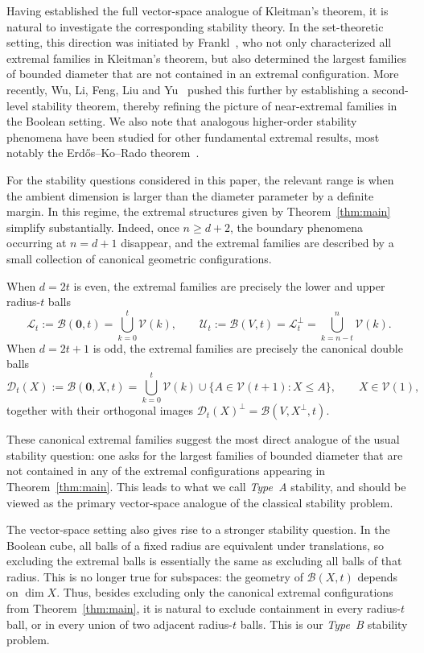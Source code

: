 \documentclass[11pt]{article}
\theoremstyle{definition}
\begin{document}
Having established the full vector-space analogue of Kleitman's theorem, it is natural to investigate the corresponding stability theory. In the set-theoretic setting, this direction was initiated by Frankl~\cite{F2017}, who not only characterized all extremal families in Kleitman's theorem, but also determined the largest families of bounded diameter that are not contained in an extremal configuration. More recently, Wu, Li, Feng, Liu and Yu~\cite{2025Li} pushed this further by establishing a second-level stability theorem, thereby refining the picture of near-extremal families in the Boolean setting. We also note that analogous higher-order stability phenomena have been studied for other fundamental extremal results, most notably the Erd\H{o}s--Ko--Rado theorem~\cite{2023CombGaoLiuXu,2024AlgeEKR,2017PAMSHanJie,1967Hilton,2024EUJCPeng,2017PAMSMubayi}.

For the stability questions considered in this paper, the relevant range is when the ambient dimension is larger than the diameter parameter by a definite margin. In this regime, the extremal structures given by Theorem~\ref{thm:main} simplify substantially. Indeed, once $n\ge d+2$, the boundary phenomena occurring at $n=d+1$ disappear, and the extremal families are described by a small collection of canonical geometric configurations.

When $d=2t$ is even, the extremal families are precisely the lower and upper radius-$t$ balls
\[
\mathcal L_t:=\mathcal B(\boldsymbol 0,t)=\bigcup_{k=0}^{t}\mathcal V(k),
\qquad
\mathcal U_t:=\mathcal B(V,t)=\mathcal L_t^\perp=\bigcup_{k=n-t}^{n}\mathcal V(k).
\]
When $d=2t+1$ is odd, the extremal families are precisely the {canonical double balls}
\[
\mathcal D_t(X):=\mathcal B(\boldsymbol 0,X,t)
=
\bigcup_{k=0}^{t}\mathcal V(k)\cup \{A\in\mathcal V(t+1):X\le A\},
\qquad X\in\mathcal V(1),
\]
together with their orthogonal images
\(
\mathcal D_t(X)^\perp=\mathcal B(V,X^\perp,t).
\)

These canonical extremal families suggest the most direct analogue of the usual stability question: one asks for the largest families of bounded diameter that are not contained in any of the extremal configurations appearing in Theorem~\ref{thm:main}. This leads to what we call \emph{Type~A} stability, and should be viewed as the primary vector-space analogue of the classical stability problem.

The vector-space setting also gives rise to a stronger stability question. In the Boolean cube, all balls of a fixed radius are equivalent under translations, so excluding the extremal balls is essentially the same as excluding all balls of that radius. This is no longer true for subspaces: the geometry of $\mathcal B(X,t)$ depends on $\dim X$. Thus, besides excluding only the canonical extremal configurations from Theorem~\ref{thm:main}, it is natural to exclude containment in every radius-$t$ ball, or in every union of two adjacent radius-$t$ balls. This is our \emph{Type~B} stability problem.
\end{document}

